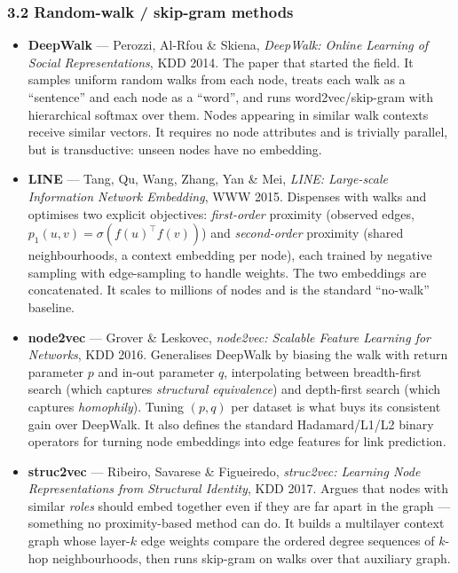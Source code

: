 \subsubsection*{3.2 Random-walk / skip-gram methods}

\begin{itemize}[label=$\bullet$,leftmargin=1.3em]
  \item \textbf{DeepWalk} --- Perozzi, Al-Rfou \& Skiena, \emph{DeepWalk: Online Learning of
        Social Representations}, KDD 2014.
        The paper that started the field. It samples uniform random walks from each node,
        treats each walk as a ``sentence'' and each node as a ``word'', and runs
        word2vec/skip-gram with hierarchical softmax over them. Nodes appearing in similar
        walk contexts receive similar vectors. It requires no node attributes and is
        trivially parallel, but is transductive: unseen nodes have no embedding.
  \item \textbf{LINE} --- Tang, Qu, Wang, Zhang, Yan \& Mei, \emph{LINE: Large-scale
        Information Network Embedding}, WWW 2015.
        Dispenses with walks and optimises two explicit objectives: \emph{first-order}
        proximity (observed edges, $p_1(u,v)=\sigma(f(u)^{\!\top}f(v))$) and
        \emph{second-order} proximity (shared neighbourhoods, a context embedding per node),
        each trained by negative sampling with edge-sampling to handle weights. The two
        embeddings are concatenated. It scales to millions of nodes and is the standard
        ``no-walk'' baseline.
  \item \textbf{node2vec} --- Grover \& Leskovec, \emph{node2vec: Scalable Feature Learning
        for Networks}, KDD 2016.
        Generalises DeepWalk by biasing the walk with return parameter $p$ and in-out
        parameter $q$, interpolating between breadth-first search (which captures
        \emph{structural equivalence}) and depth-first search (which captures
        \emph{homophily}). Tuning $(p,q)$ per dataset is what buys its consistent gain over
        DeepWalk. It also defines the standard Hadamard/L1/L2 binary operators for turning
        node embeddings into edge features for link prediction.
  \item \textbf{struc2vec} --- Ribeiro, Savarese \& Figueiredo, \emph{struc2vec: Learning
        Node Representations from Structural Identity}, KDD 2017.
        Argues that nodes with similar \emph{roles} should embed together even if they are
        far apart in the graph --- something no proximity-based method can do. It builds a
        multilayer context graph whose layer-$k$ edge weights compare the ordered degree
        sequences of $k$-hop neighbourhoods, then runs skip-gram on walks over that
        auxiliary graph.
\end{itemize}

